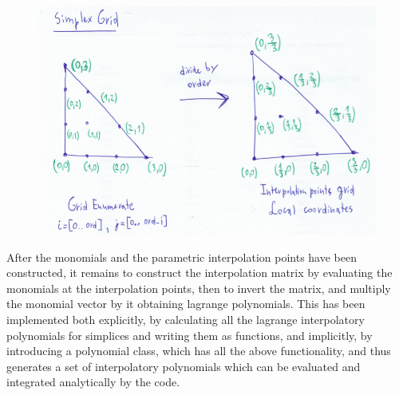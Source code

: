 \begin{figure}[hp]
    \centering
    \includegraphics[scale=0.5]{images/pic-simplex-grid.png}
\end{figure}

\noindent
After the monomials and the parametric interpolation points have been constructed, it remains to construct the interpolation matrix by evaluating the monomials at the interpolation points, then to invert the matrix, and multiply the monomial vector by it obtaining lagrange polynomials. This has been implemented both explicitly, by calculating all the lagrange interpolatory polynomials for simplices and writing them as functions, and implicitly, by introducing a polynomial class, which has all the above functionality, and thus generates a set of interpolatory polynomials which can be evaluated and integrated analytically by the code.